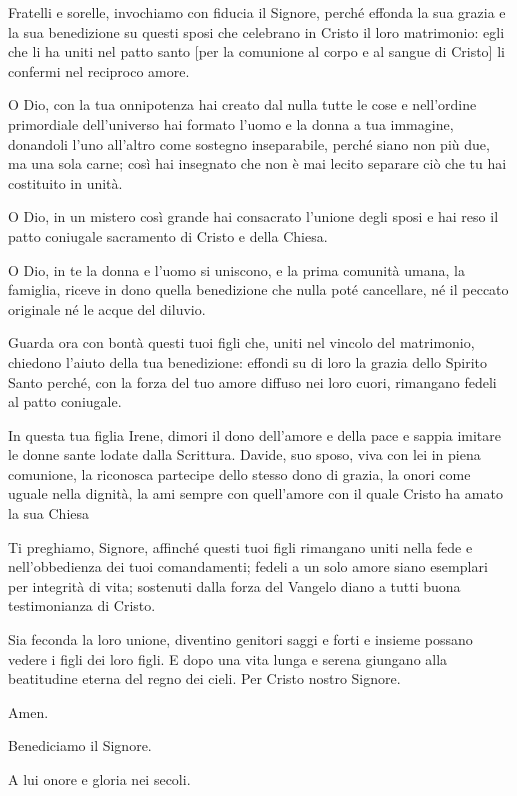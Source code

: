 	\begin{dialoghi}
		\item[\sacerdote] Fratelli e sorelle, invochiamo con fiducia il Signore, perché effonda la sua grazia e la sua benedizione su questi sposi che celebrano in Cristo il loro matrimonio: egli che li ha uniti nel patto santo [per la comunione al corpo e al sangue di Cristo] li confermi nel reciproco amore.

		O Dio, con la tua onnipotenza hai creato dal nulla tutte le cose e nell'ordine primordiale dell'universo hai formato l'uomo e la donna a tua immagine, donandoli l'uno all'altro come sostegno inseparabile, perché siano non più due, ma una sola carne; così hai insegnato che non è mai lecito separare ciò che tu hai costituito in unità.

		O Dio, in un mistero così grande hai consacrato l'unione degli sposi e hai reso il patto coniugale sacramento di Cristo e della Chiesa.

		O Dio, in te la donna e l'uomo si uniscono, e la prima comunità umana, la famiglia, riceve in dono quella benedizione che nulla poté cancellare, né il peccato originale né le acque del diluvio.

		Guarda ora con bontà questi tuoi figli che, uniti nel vincolo del matrimonio, chiedono l'aiuto della tua benedizione: effondi su di loro la grazia dello Spirito Santo perché, con la forza del tuo amore diffuso nei loro cuori, rimangano fedeli al patto coniugale.

		In questa tua figlia Irene, dimori il dono dell'amore e della pace e sappia imitare le donne sante lodate dalla Scrittura. Davide, suo sposo, viva con lei in piena comunione, la riconosca partecipe dello stesso dono di grazia, la onori come uguale nella dignità, la ami sempre con quell'amore con il quale Cristo ha amato la sua Chiesa

		Ti preghiamo, Signore, affinché questi tuoi figli rimangano uniti nella fede e nell'obbedienza dei tuoi comandamenti; fedeli a un solo amore siano esemplari per integrità di vita; sostenuti dalla forza del Vangelo diano a tutti buona testimonianza di Cristo.

		Sia feconda la loro unione, diventino genitori saggi e forti e insieme possano vedere i figli dei loro figli. E dopo una vita lunga e serena giungano alla beatitudine eterna del regno dei cieli. Per Cristo nostro Signore.
		\item[\assemblea] Amen.
		\item[\sacerdote] Benediciamo il Signore.
		\item[\assemblea] A lui onore e gloria nei secoli.
	\end{dialoghi}

\newpage